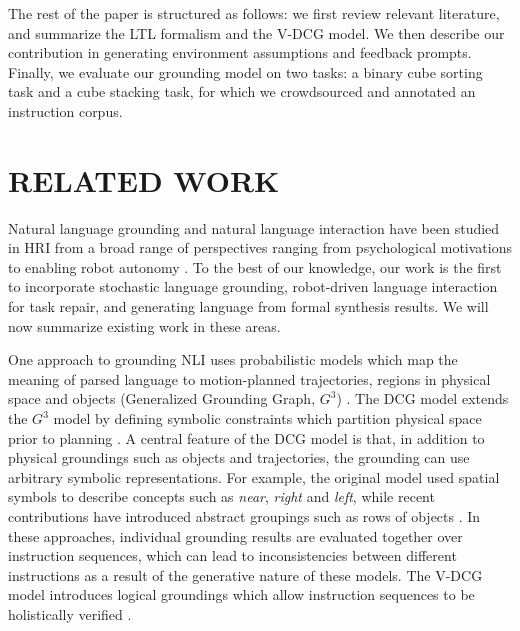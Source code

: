 \documentclass[letterpaper]{article} %
\begin{document}
The rest of the paper is structured as follows: we first review relevant literature, and summarize the LTL formalism and the V-DCG model.
We then describe our contribution in generating environment assumptions and feedback prompts.
Finally, we evaluate our grounding model on two tasks: a binary cube sorting task and a cube stacking task, for which we crowdsourced and annotated an instruction corpus.

\section{RELATED WORK}\label{sec:related_work}

Natural language grounding and natural language interaction have been studied in HRI from a broad range of perspectives ranging from psychological motivations to enabling robot autonomy \cite{roy2005grounding}. To the best of our knowledge, our work is the first to incorporate stochastic language grounding, robot-driven language interaction for task repair, and generating language from formal synthesis results. We will now summarize existing work in these areas.

One approach to grounding NLI uses probabilistic models which map the meaning of parsed language to motion-planned trajectories, regions in physical space and objects (Generalized Grounding Graph, $G^3$) \cite{tellex2011understanding}. The DCG model extends the $G^3$ model by defining symbolic constraints which partition physical space prior to planning \cite{howard2014natural}. A central feature of the DCG model is that, in addition to physical groundings such as objects and trajectories, the grounding can use arbitrary symbolic representations. For example, the original model used spatial symbols to describe concepts such as \textit{near}, \textit{right} and \textit{left}, while recent contributions have introduced abstract groupings such as rows of objects \cite{Paul2016Abstract}. In these approaches, individual grounding results are evaluated together over instruction sequences, which can lead to inconsistencies between different instructions as a result of the generative nature of these models. The V-DCG model introduces logical groundings which allow instruction sequences to be holistically verified \cite{boteanu2016model}. 

\end{document}
